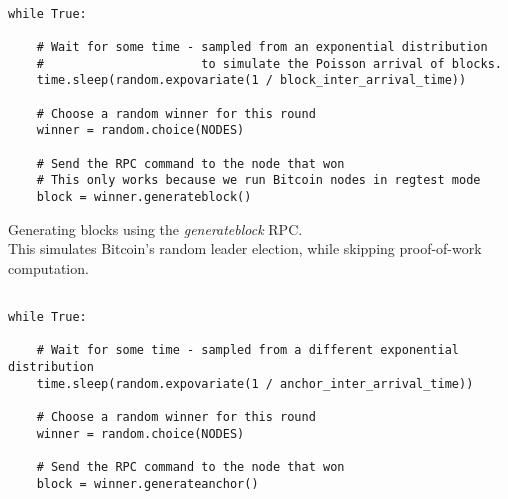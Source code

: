 \begin{listing}[!htb]
    \begin{verbatim}

while True:

    # Wait for some time - sampled from an exponential distribution
    #                      to simulate the Poisson arrival of blocks.
    time.sleep(random.expovariate(1 / block_inter_arrival_time))

    # Choose a random winner for this round
    winner = random.choice(NODES)

    # Send the RPC command to the node that won
    # This only works because we run Bitcoin nodes in regtest mode
    block = winner.generateblock()

    \end{verbatim}

    \caption[Generating blocks using the \textit{generateblock} RPC]
    {
        Generating blocks using the \textit{generateblock} RPC.\\
        \medskip
        \footnotesize
        This simulates Bitcoin's random leader election, while skipping proof-of-work computation.
    }
    \label{code-testbed-generateblock}
\end{listing}

\begin{listing}[!htb]
    \begin{verbatim}

while True:

    # Wait for some time - sampled from a different exponential distribution
    time.sleep(random.expovariate(1 / anchor_inter_arrival_time))

    # Choose a random winner for this round
    winner = random.choice(NODES)

    # Send the RPC command to the node that won
    block = winner.generateanchor()

    \end{verbatim}

    \caption[Generating anchors using the \textit{generateanchor} RPC]
    {
        Generating anchors using the \textit{generateanchor} RPC. \\
        \medskip
        \footnotesize
        Since Anchors are mined on a different (and easier) target than Blocks, they have a lower inter-arrival time
        but the process is akin to the leader election done for Blocks.
        Here too, we skip performing any proof-of-work.
    }
    \label{code-testbed-generateanchor}
\end{listing}

